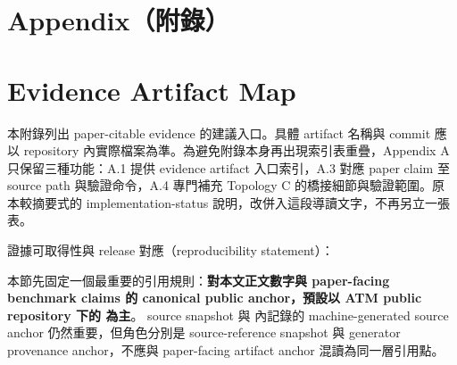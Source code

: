 \documentclass[a4paper,fontset=none]{ctexart}
\begin{document}
\medskip

\appendix
\section*{Appendix（附錄）}

\section*{Evidence Artifact Map}

本附錄列出 paper-citable evidence 的建議入口。具體 artifact 名稱與 commit 應以 repository 內實際檔案為準。為避免附錄本身再出現索引表重疊，Appendix A 只保留三種功能：A.1 提供 evidence artifact 入口索引，A.3 對應 paper claim 至 source path 與驗證命令，A.4 專門補充 Topology C 的橋接細節與驗證範圍。原本較摘要式的 implementation-status 說明，改併入這段導讀文字，不再另立一張表。

證據可取得性與 release 對應（reproducibility statement）：

本節先固定一個最重要的引用規則：\textbf{對本文正文數字與 paper-facing benchmark claims 的 canonical public anchor，預設以 ATM public repository \texttt{} 下的 \texttt{} 為主}。\texttt{} source snapshot 與 \texttt{} 內記錄的 machine-generated source anchor 仍然重要，但角色分別是 source-reference snapshot 與 generator provenance anchor，不應與 paper-facing artifact anchor 混讀為同一層引用點。
\end{document}
